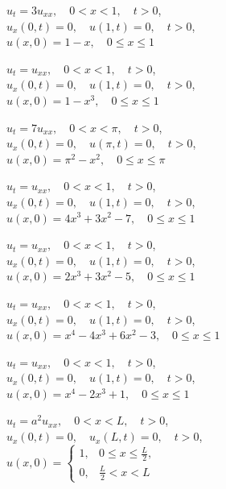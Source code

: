 \begin{exerciselist}
\item\label{exer:12.1.36}\Cex
$u_t=3u_{xx},\quad 0<x<1,\quad t>0$,\\
$u_x(0,t)=0,\quad u(1,t)=0,\quad t>0$,\\
$u(x,0)=1-x,\quad 0\le x\le 1$



\item\label{exer:12.1.37}$u_t=u_{xx},\quad 0<x<1,\quad t>0$,\\
$u_x(0,t)=0,\quad u(1,t)=0,\quad t>0$,\\
$u(x,0)=1-x^3,\quad 0\le x\le 1$

\item\label{exer:12.1.38}$u_t=7u_{xx},\quad 0<x<\pi,\quad t>0$,\\
$u_x(0,t)=0,\quad u(\pi,t)=0,\quad t>0$,\\
$u(x,0)=\pi^2-x^2,\quad 0\le x\le \pi$


\item\label{exer:12.1.39}$u_t=u_{xx},\quad 0<x<1,\quad t>0$,\\
$u_x(0,t)=0,\quad u(1,t)=0,\quad t>0$,\\
$u(x,0)=4x^3+3x^2-7,\quad 0\le x\le 1$

\item\label{exer:12.1.40}$u_t=u_{xx},\quad 0<x<1,\quad t>0$,\\
$u_x(0,t)=0,\quad u(1,t)=0,\quad t>0$,\\
$u(x,0)=2x^3+3x^2-5,\quad 0\le x\le 1$


\item\label{exer:12.1.41}\Cex
$u_t=u_{xx},\quad 0<x<1,\quad t>0$,\\
$u_x(0,t)=0,\quad u(1,t)=0,\quad t>0$,\\
$u(x,0)=x^4-4x^3+6x^2-3,\quad 0\le x\le 1$

\item\label{exer:12.1.42}$u_t=u_{xx},\quad 0<x<1,\quad t>0$,\\
$u_x(0,t)=0,\quad u(1,t)=0,\quad t>0$,\\
$u(x,0)=x^4-2x^3+1,\quad 0\le x\le 1$


\item\label{exer:12.1.43}\Cex
$u_t=a^2u_{xx},\quad 0<x<L,\quad t>0$,\\
$u_x(0,t)=0,\quad u_x(L,t)=0,\quad t>0$,\\
$u(x,0)=
\begin{cases}
1,&0\le x\le\frac{L}{2},\\0,&\frac{L}{2}<x<L
\end{cases}$



\end{exerciselist}
